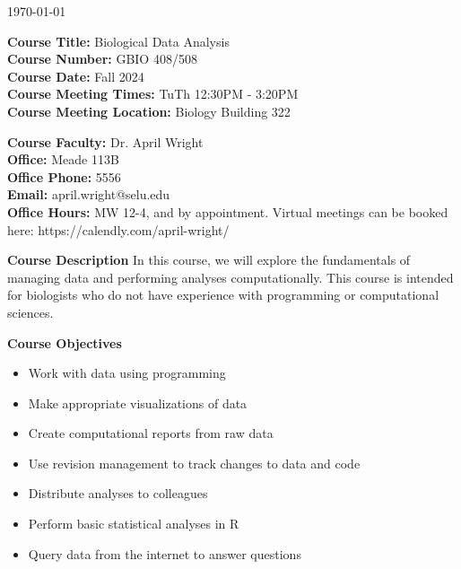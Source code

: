 \documentclass[12pt]{article}
\let\oldtextbf\textbf
\renewcommand{\textbf}[1]{\textcolor{coolblack}{\oldtextbf{#1}}}
\begin{document}
\thispagestyle{fancy}
\begin{flushright}
\today
\end{flushright}
\vspace{2mm}
\begin{flushleft}
\textbf{Course Title:} Biological Data Analysis \\
\textbf{Course Number:} GBIO 408/508\\


\textbf{Course Date:} Fall 2024 \\

\textbf{Course Meeting Times:} TuTh 12:30PM - 3:20PM \\
\textbf{Course Meeting Location:} Biology Building 322 \\
\end{flushleft}

\bigskip

\begin{flushleft}
\textbf{Course Faculty:} Dr. April Wright \\
\textbf{Office:} Meade 113B\\
\textbf{Office Phone:} 5556 \\
\textbf{Email:} april.wright@selu.edu   \\
\textbf{Office Hours:} MW 12-4, and by appointment. Virtual meetings can be booked here: https://calendly.com/april-wright/ \\

\end{flushleft}

\bigskip

\begin{flushleft}

\textbf{Course Description}
In this course, we will explore the fundamentals of managing data and performing analyses computationally. This course is intended for biologists who do not have experience with programming or computational sciences.

\end{flushleft}

\bigskip
\begin{flushleft}

\textbf{Course Objectives}

\begin{itemize}

\item Work with data using programming
\item Make appropriate visualizations of data
\item Create computational reports from raw data
\item Use revision management to track changes to data and code
\item Distribute analyses to colleagues
\item Perform basic statistical analyses in R
\item Query data from the internet to answer questions

\end{itemize}
\end{flushleft}
\end{document}
